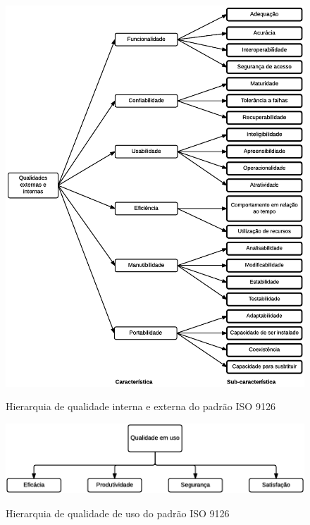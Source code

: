 \documentclass[
	12pt,				%
	openright,			%
	oneside,			%
	a4paper,			%
	english,			%
	brazil,				%
	]{abntex2}
\begin{document}
\begin{figure}[H]
    \centering
    \caption{Hierarquia de qualidade interna e externa do padrão ISO 9126}
    \graphicspath{ {./graphics/} }
    \includegraphics[scale=1.0]{iso9126-hierarquia_interno_externo-andrei}
    \label{fig:iso9126-hierarquia_interno_externo}
\end{figure}

\begin{figure}[h]
    \centering
    \caption{Hierarquia de qualidade de uso do padrão ISO 9126}
    \graphicspath{ {./graphics/} }
    \includegraphics[scale=0.95]{iso9126-hierarquia_qualidade_uso-andrei}
    \label{fig:iso9126-hierarquia_qualidade_uso}
\end{figure}
\end{document}

